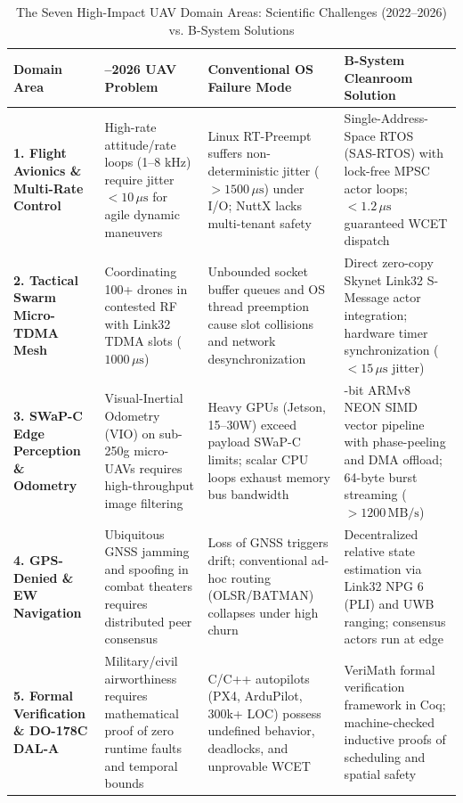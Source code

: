 \documentclass[10pt,journal,compsoc,twocolumn]{article}
\begin{document}
\begin{table}[t]
\centering
\caption{The Seven High-Impact UAV Domain Areas: Scientific Challenges (2022--2026) vs. B-System Solutions}
\label{tab:seven_domains}
\scriptsize
\setlength{\tabcolsep}{3.5pt}
\renewcommand{\arraystretch}{1.14}
\begin{tabularx}{\textwidth}{@{} >{\raggedright\arraybackslash\bfseries}p{2.5cm} >{\raggedright\arraybackslash}p{3.8cm} >{\raggedright\arraybackslash}p{4.0cm} >{\raggedright\arraybackslash}X @{}}
\toprule
Domain Area & 2022--2026 UAV Problem & Conventional OS Failure Mode & B-System Cleanroom Solution \\
\midrule
1. Flight Avionics \& Multi-Rate Control & High-rate attitude/rate loops (1--8 kHz) require jitter $<10\,\mu\text{s}$ for agile dynamic maneuvers & Linux RT-Preempt suffers non-deterministic jitter ($>1500\,\mu\text{s}$) under I/O; NuttX lacks multi-tenant safety & Single-Address-Space RTOS (SAS-RTOS) with lock-free MPSC actor loops; $<1.2\,\mu\text{s}$ guaranteed WCET dispatch \\
2. Tactical Swarm Micro-TDMA Mesh & Coordinating 100+ drones in contested RF with Link32 TDMA slots ($1000\,\mu\text{s}$) & Unbounded socket buffer queues and OS thread preemption cause slot collisions and network desynchronization & Direct zero-copy Skynet Link32 S-Message actor integration; hardware timer synchronization ($<15\,\mu\text{s}$ jitter) \\
3. SWaP-C Edge Perception \& Odometry & Visual-Inertial Odometry (VIO) on sub-250g micro-UAVs requires high-throughput image filtering & Heavy GPUs (Jetson, 15--30W) exceed payload SWaP-C limits; scalar CPU loops exhaust memory bus bandwidth & 128-bit ARMv8 NEON SIMD vector pipeline with phase-peeling and DMA offload; 64-byte burst streaming ($>1200\,\text{MB/s}$) \\
4. GPS-Denied \& EW Navigation & Ubiquitous GNSS jamming and spoofing in combat theaters requires distributed peer consensus & Loss of GNSS triggers drift; conventional ad-hoc routing (OLSR/BATMAN) collapses under high churn & Decentralized relative state estimation via Link32 NPG 6 (PLI) and UWB ranging; consensus actors run at edge \\
5. Formal Verification \& DO-178C DAL-A & Military/civil airworthiness requires mathematical proof of zero runtime faults and temporal bounds & C/C++ autopilots (PX4, ArduPilot, 300k+ LOC) possess undefined behavior, deadlocks, and unprovable WCET & VeriMath formal verification framework in Coq; machine-checked inductive proofs of scheduling and spatial safety \\

\end{tabularx}
\end{table}
\end{document}
